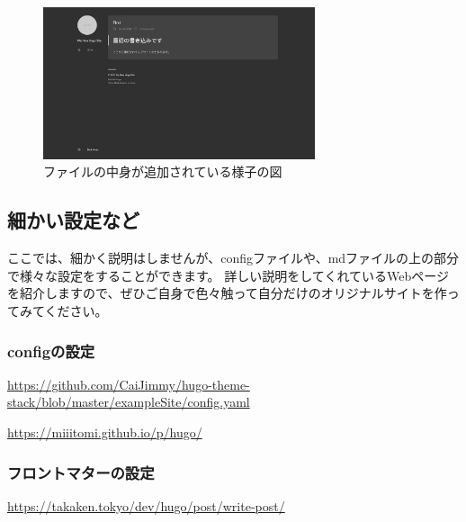     \begin{figure}[H]
      \centering
      \includegraphics[width=8cm]{./image/02-chap5/add-file-content.png}
      \caption{ファイルの中身が追加されている様子の図}
      \label{chap5-add-file-content-image}
    \end{figure}

  \subsection{細かい設定など}
    ここでは、細かく説明はしませんが、configファイルや、mdファイルの上の部分で様々な設定をすることができます。
    詳しい説明をしてくれているWebページを紹介しますので、ぜひご自身で色々触って自分だけのオリジナルサイトを作ってみてください。

    \subsubsection{configの設定}
      \url{https://github.com/CaiJimmy/hugo-theme-stack/blob/master/exampleSite/config.yaml}

      \url{https://miiitomi.github.io/p/hugo/}

    \subsubsection{フロントマターの設定}
      \url{https://takaken.tokyo/dev/hugo/post/write-post/}

    




    
  


